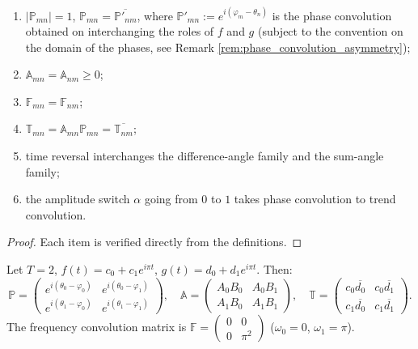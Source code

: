 \begin{property}\label{prop:convolution_types_properties}
\begin{enumerate}[label=(\roman*)]
    \item $|\mathbb{P}_{mn}| = 1$, $\mathbb{P}_{mn} = \overline{\mathbb{P}'_{nm}}$, where $\mathbb{P}'_{mn} := e^{i(\varphi_m - \theta_n)}$ is the phase convolution obtained on interchanging the roles of $f$ and $g$ (subject to the convention on the domain of the phases, see Remark \ref{rem:phase_convolution_asymmetry});
    \item $\mathbb{A}_{mn} = \mathbb{A}_{nm} \ge 0$;
    \item $\mathbb{F}_{mn} = \mathbb{F}_{nm}$;
    \item $\mathbb{T}_{mn} = \mathbb{A}_{mn} \mathbb{P}_{mn} = \overline{\mathbb{T}_{nm}}$;
    \item time reversal interchanges the difference-angle family and the sum-angle family;
    \item the amplitude switch $\alpha$ going from $0$ to $1$ takes phase convolution to trend convolution.
\end{enumerate}
\end{property}

\begin{proof}
Each item is verified directly from the definitions.
\end{proof}

\begin{example}\label{ex:period_two_matrix}
Let $T = 2$, $f(t) = c_0 + c_1 e^{i\pi t}$, $g(t) = d_0 + d_1 e^{i\pi t}$. Then:
\[
\mathbb{P} = \begin{pmatrix}
e^{i(\theta_0 - \varphi_0)} & e^{i(\theta_0 - \varphi_1)} \\
e^{i(\theta_1 - \varphi_0)} & e^{i(\theta_1 - \varphi_1)}
\end{pmatrix}, \quad
\mathbb{A} = \begin{pmatrix}
A_0 B_0 & A_0 B_1 \\
A_1 B_0 & A_1 B_1
\end{pmatrix}, \quad
\mathbb{T} = \begin{pmatrix}
c_0 \overline{d_0} & c_0 \overline{d_1} \\
c_1 \overline{d_0} & c_1 \overline{d_1}
\end{pmatrix}.
\]
The frequency convolution matrix is $\mathbb{F} = \begin{pmatrix} 0 & 0 \\ 0 & \pi^2 \end{pmatrix}$ ($\omega_0 = 0$, $\omega_1 = \pi$).
\end{example}

